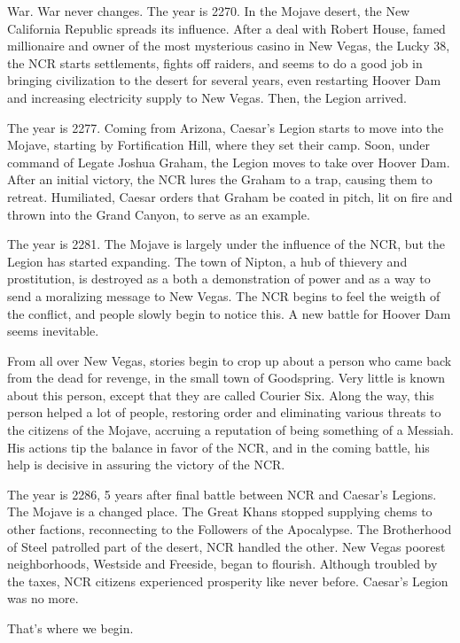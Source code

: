 \documentclass[11pt]{article} %
\begin{document}
War. War never changes. The year is 2270. In the Mojave desert, the New California Republic spreads its influence. After a deal with Robert House, famed millionaire and owner of the most mysterious casino in New Vegas, the Lucky 38, the NCR starts settlements, fights off raiders, and seems to do a good job in bringing civilization to the desert for several years, even restarting Hoover Dam and increasing electricity supply to New Vegas. Then, the Legion arrived.

The year is 2277. Coming from Arizona, Caesar's Legion starts to move into the Mojave, starting by Fortification Hill, where they set their camp. Soon, under command of Legate Joshua Graham, the Legion moves to take over Hoover Dam. After an initial victory, the NCR lures the Graham to a trap, causing them to retreat. Humiliated, Caesar orders that Graham be coated in pitch, lit on fire and thrown into the Grand Canyon, to serve as an example. 

The year is 2281. The Mojave is largely under the influence of the NCR, but the Legion has started expanding. The town of Nipton, a hub of thievery and prostitution, is destroyed as a both a demonstration of power and as a way to send a moralizing message to New Vegas. The NCR begins to feel the weigth of the conflict, and people slowly begin to notice this. A new battle for Hoover Dam seems inevitable. 

From all over New Vegas, stories begin to crop up about a person who came back from the dead for revenge, in the small town of Goodspring. Very little is known about this person, except that they are called Courier Six. Along the way, this person helped a lot of people, restoring order and eliminating various threats to the citizens of the Mojave, accruing a reputation of being something of a Messiah. His actions tip the balance in favor of the NCR, and in the coming battle, his help is decisive in assuring the victory of the NCR.

The year is 2286, 5 years after final battle between NCR and Caesar's Legions. The Mojave is a changed place. The Great Khans stopped supplying chems to other factions, reconnecting to the Followers of the Apocalypse. The Brotherhood of Steel patrolled part of the desert, NCR handled the other. New Vegas poorest neighborhoods, Westside and Freeside, began to flourish. Although troubled by the taxes, NCR citizens experienced prosperity like never before. Caesar's Legion was no more.

That's where we begin.
\end{document}
